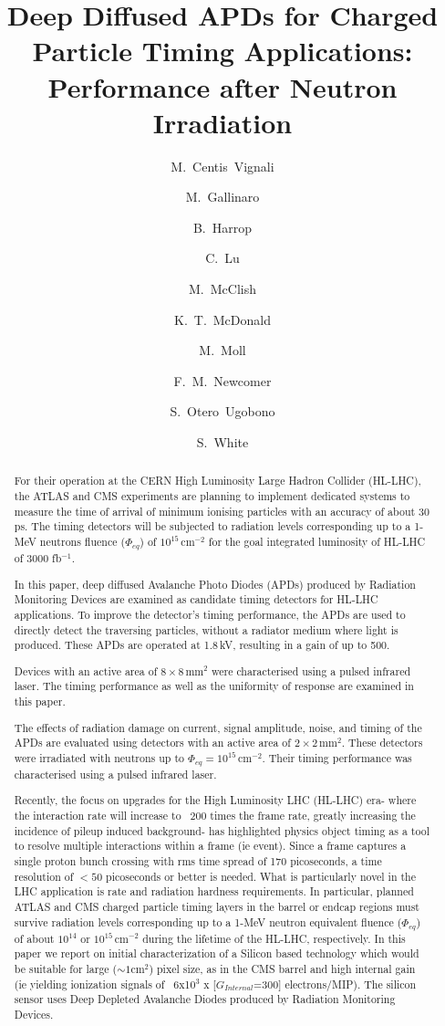 \documentclass{article}
\title{Deep Diffused APDs for Charged Particle Timing Applications: Performance after Neutron Irradiation}
\author[1]{M.~Centis~Vignali}
\author[1,2]{M.~Gallinaro}
\author[3]{B.~Harrop}
\author[3]{C.~Lu}
\author[4]{M.~McClish}
\author[3]{K.~T.~McDonald}
\author[1]{M.~Moll}
\author[5]{F.~M.~Newcomer}
\author[1,6]{S.~Otero~Ugobono}
\author[1,7]{S.~White}
\affil[1]{CERN, Geneva, Switzerland}
\affil[2]{LIP, Lisbon, Portugal}
\affil[3]{Princeton University, Princeton, USA}
\affil[4]{Radiation Monitoring Devices, Watertown, USA}
\affil[5]{University of Pennsylvania, Philadelphia, USA}
\affil[6]{Universidade de Santiago de Compostela, Santiago de Compostela, Spain}
\affil[7]{University of Virginia, Charlottesville, USA}
\begin{document}
\maketitle

\begin{abstract}
For their operation at the CERN High Luminosity Large Hadron Collider (HL-LHC), the ATLAS and CMS experiments are planning to implement dedicated systems to measure the time of arrival of minimum ionising particles with an accuracy of about 30 ps.
The timing detectors will be subjected to radiation levels corresponding up to a 1-MeV neutrons fluence ($\Phi_{eq}$) of $10^{15}$\,cm$^{-2}$ for the goal integrated luminosity of HL-LHC of 3000 fb$^{-1}$.
  
In this paper, deep diffused Avalanche Photo Diodes (APDs) produced by Radiation Monitoring Devices are examined as candidate timing detectors for HL-LHC applications.
To improve the detector's timing performance, the APDs are used to directly detect the traversing particles, without a radiator medium where light is produced.
These APDs are operated at 1.8\,kV, resulting in a gain of up to 500.

Devices with an active area of $8 \times 8$\,mm$^2$ were characterised using a pulsed infrared laser.
The timing performance as well as the uniformity of response are examined in this paper.

The effects of radiation damage on current, signal amplitude, noise, and timing of the APDs are evaluated using detectors with an active area of $2 \times 2$\,mm$^2$.
These detectors were irradiated with neutrons up to $\Phi_{eq} = 10^{15}$\,cm$^{-2}$.
Their timing performance was characterised using a pulsed infrared laser.



Recently, the focus on upgrades for the High Luminosity LHC (HL-LHC) era- where the interaction rate will increase to ~200 times the frame rate, greatly increasing the incidence of pileup induced background- has highlighted physics object timing as a tool to resolve multiple interactions within a frame (ie event). Since a frame captures a single proton bunch crossing with rms time spread of 170 picoseconds, a time resolution of $<50$ picoseconds or better is needed. What is particularly novel in the LHC application is rate and radiation hardness requirements.
In particular, planned ATLAS and CMS charged particle timing layers in the barrel or endcap regions must survive radiation levels corresponding up to a 1-MeV neutron equivalent fluence ($\Phi_{eq}$) of about $10^{14}$ or $10^{15}$\,cm$^{-2}$ during the lifetime of the HL-LHC, respectively. 
In this paper we report on initial characterization of a Silicon based technology which would be suitable for large ($\sim1$cm$^{2}$) pixel size, as in the CMS barrel and high internal gain (ie yielding ionization signals of ~6x10$^{3}$ x [$G_{Internal}$=300] electrons/MIP). The silicon sensor uses Deep Depleted Avalanche Diodes produced by Radiation Monitoring Devices. 


\end{abstract}
\end{document}
